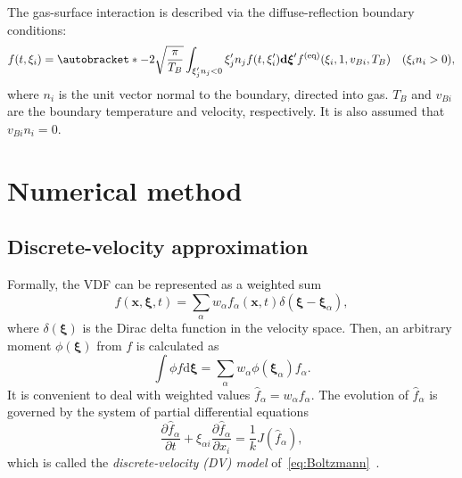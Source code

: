 \documentclass[]{elsarticle} %
\newcommand{\dd}{\mathrm{d}}
\newcommand{\pder}[2][]{\frac{\partial#1}{\partial#2}}
\DeclarePairedDelimiter\autobracket()       %
\newcommand{\br}[1]{\autobracket*{#1}}
\newcommand{\dxi}{\boldsymbol{\dd\xi}}
\newcommand{\bxi}{{\boldsymbol{\xi}}}
\newcommand{\bxia}{\bxi_\alpha}
\newcommand{\bx}{\boldsymbol{x}}
\newcommand{\xiai}{\xi_{\alpha i}}
\newcommand{\equil}[1]{#1^\mathrm{(eq)}}
\begin{document}
{%
The gas-surface interaction is described via the diffuse-reflection boundary conditions:
\begin{equation}\label{eq:diffuse}
    f(t,\xi_i) = \br{-2\sqrt\frac\pi{T_B} \int_{\xi'_jn_j<0}\xi'_jn_jf(t,\xi'_i)\dxi'}
        \equil{f}(\xi_i,1,v_{Bi},T_B) \quad (\xi_in_i>0),
\end{equation}
where \(n_i\) is the unit vector normal to the boundary, directed into gas.
\(T_B\) and \(v_{Bi}\) are the boundary temperature and velocity, respectively.
It is also assumed that \(v_{Bi}n_i = 0\).

\section{Numerical method}\label{sec:numerics}

\subsection{Discrete-velocity approximation}\label{sec:dv}

Formally, the VDF can be represented as a weighted sum
\begin{equation}\label{eq:discrete_velocity}
    f(\bx,\bxi,t) = \sum_\alpha w_\alpha f_\alpha(\bx,t)\delta(\bxi-\bxia),
\end{equation}
where \(\delta(\bxi)\) is the Dirac delta function in the velocity space.
Then, an arbitrary moment \(\phi(\bxi)\) from \(f\) is calculated as
\begin{equation}\label{eq:cubature}
    \int \phi f\dxi = \sum_\alpha w_\alpha \phi(\bxia) f_\alpha.
\end{equation}
It is convenient to deal with weighted values \(\hat{f}_\alpha = w_\alpha f_\alpha\).
The evolution of \(\hat{f}_\alpha\) is governed by the system of partial differential equations
\begin{equation}\label{eq:dvm}
    \pder[\hat{f}_\alpha]{t} + \xiai\pder[\hat{f}_\alpha]{x_i} = \frac1kJ(\hat{f}_\alpha),
\end{equation}
which is called the \emph{discrete-velocity (DV) model} of~\eqref{eq:Boltzmann}~\cite{Cabannes1980}.

}
\end{document}
